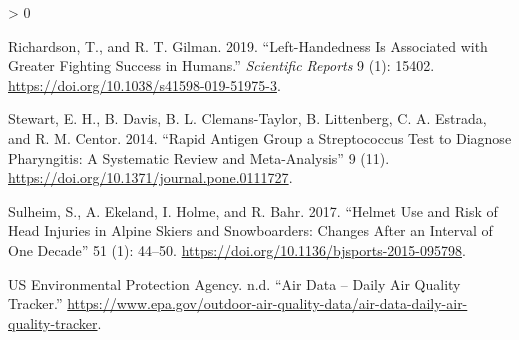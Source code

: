 \documentclass[
]{report}
\newlength{\cslhangindent}
\newenvironment{CSLReferences}[2] %
 {%
  \setlength{\parindent}{0pt}
  \ifodd #1 \everypar{\setlength{\hangindent}{\cslhangindent}}\ignorespaces\fi
  \ifnum #2 > 0
  \setlength{\parskip}{#2\baselineskip}
  \fi
 }%
 {}
\begin{document}
\begin{CSLReferences}{1}{0}
\leavevmode\hypertarget{ref-richardson2019}{}%
Richardson, T., and R. T. Gilman. 2019. {``Left-Handedness Is Associated with Greater Fighting Success in Humans.''} \emph{Scientific Reports} 9 (1): 15402. \url{https://doi.org/10.1038/s41598-019-51975-3}.

\leavevmode\hypertarget{ref-stewart2014}{}%
Stewart, E. H., B. Davis, B. L. Clemans-Taylor, B. Littenberg, C. A. Estrada, and R. M. Centor. 2014. {``Rapid Antigen Group a Streptococcus Test to Diagnose Pharyngitis: A Systematic Review and Meta-Analysis''} 9 (11). \url{https://doi.org/10.1371/journal.pone.0111727}.

\leavevmode\hypertarget{ref-sulheim2017}{}%
Sulheim, S., A. Ekeland, I. Holme, and R. Bahr. 2017. {``Helmet Use and Risk of Head Injuries in Alpine Skiers and Snowboarders: Changes After an Interval of One Decade''} 51 (1): 44--50. \url{https://doi.org/10.1136/bjsports-2015-095798}.

\leavevmode\hypertarget{ref-usepa2020}{}%
US Environmental Protection Agency. n.d. {``Air Data -- Daily Air Quality Tracker.''} \url{https://www.epa.gov/outdoor-air-quality-data/air-data-daily-air-quality-tracker}.

\end{CSLReferences}
\end{document}
